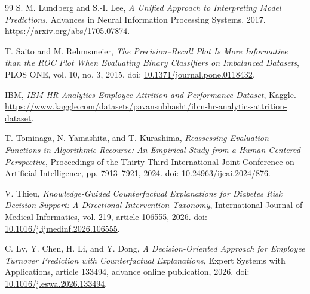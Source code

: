 \documentclass[11pt]{article}
\begin{document}
\begin{thebibliography}{99}
S. M. Lundberg and S.-I. Lee, \emph{A Unified Approach to Interpreting Model Predictions}, Advances in Neural Information Processing Systems, 2017. \url{https://arxiv.org/abs/1705.07874}.

T. Saito and M. Rehmsmeier, \emph{The Precision--Recall Plot Is More Informative than the ROC Plot When Evaluating Binary Classifiers on Imbalanced Datasets}, PLOS ONE, vol. 10, no. 3, 2015. doi: \href{https://doi.org/10.1371/journal.pone.0118432}{10.1371/journal.pone.0118432}.

IBM, \emph{IBM HR Analytics Employee Attrition and Performance Dataset}, Kaggle. \url{https://www.kaggle.com/datasets/pavansubhasht/ibm-hr-analytics-attrition-dataset}.

T. Tominaga, N. Yamashita, and T. Kurashima, \emph{Reassessing Evaluation Functions in Algorithmic Recourse: An Empirical Study from a Human-Centered Perspective}, Proceedings of the Thirty-Third International Joint Conference on Artificial Intelligence, pp. 7913--7921, 2024. doi: \href{https://doi.org/10.24963/ijcai.2024/876}{10.24963/ijcai.2024/876}.

V. Thieu, \emph{Knowledge-Guided Counterfactual Explanations for Diabetes Risk Decision Support: A Directional Intervention Taxonomy}, International Journal of Medical Informatics, vol. 219, article 106555, 2026. doi: \href{https://doi.org/10.1016/j.ijmedinf.2026.106555}{10.1016/j.ijmedinf.2026.106555}.

C. Lv, Y. Chen, H. Li, and Y. Dong, \emph{A Decision-Oriented Approach for Employee Turnover Prediction with Counterfactual Explanations}, Expert Systems with Applications, article 133494, advance online publication, 2026. doi: \href{https://doi.org/10.1016/j.eswa.2026.133494}{10.1016/j.eswa.2026.133494}.
\end{thebibliography}
\end{document}

